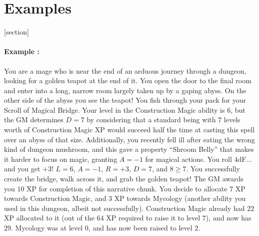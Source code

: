 \section{Examples}

[section]
\newenvironment{example}{\paragraph{Example \theexample:}}{}

\begin{example}
You are a mage who is near the end of an arduous journey through a dungeon, looking for a golden teapot at the end of it.
You open the door to the final room and enter into a long, narrow room largely taken up by a gaping abyss.
On the other side of the abyss you see the teapot!
You fish through your pack for your Scroll of Magical Bridge.
Your level in the Construction Magic ability is $6$,
but the GM determines
$D = 7$
by considering that a standard being with $7$ levels worth of Construction Magic XP would succeed half the time at casting this spell over an abyss of that size.
Additionally, you recently fell ill after eating the wrong kind of dungeon mushroom,
and this gave a property ``Shroom Belly'' that makes it harder to focus on magic,
granting $A = -1$ for magical actions.
You roll $4$dF... and you get $+3$!
$L = 6$, $A = -1$, $R = +3$, $D = 7$, and $8 \geq 7$.
You successfully create the bridge, walk across it, and grab the golden teapot!
The GM awards you $10$ XP for completion of this narrative chunk.
You decide to allocate $7$ XP towards Construction Magic, and $3$ XP towards Mycology (another ability you used in this dungeon, albeit not successfully).
Construction Magic already had $22$ XP allocated to it (out of the $64$ XP required to raise it to level $7$), and now has $29$.
Mycology was at level $0$, and has now been raised to level $2$.
\end{example}


